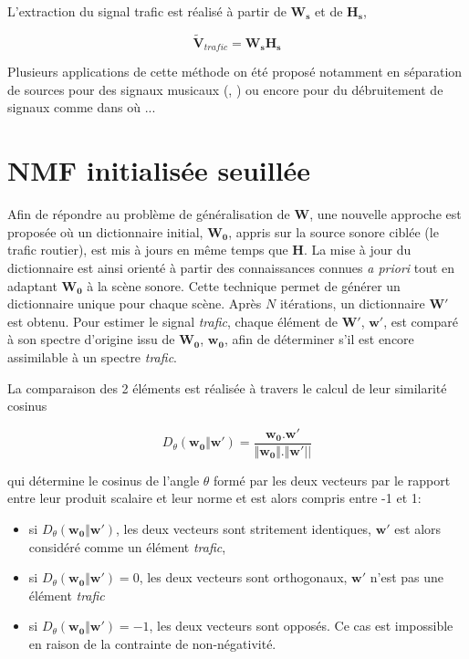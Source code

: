 L'extraction du signal trafic est réalisé à partir de $\mathbf{W_s}$ et de $\mathbf{H_s}$, 

\begin{equation}
\mathbf{\tilde{V}}_{trafic} = \mathbf{W_s H_s}
\end{equation}

Plusieurs applications de cette méthode on été proposé notamment en séparation de sources pour des signaux musicaux (\cite{smaragdis_supervised_2007}, \cite{duan_online_2012}) ou encore pour du débruitement de signaux comme dans \cite{mysore_non-negative_2011} où ... 

\section{NMF initialisée seuillée}\label{sec:NMF_TI}

Afin de répondre au problème de généralisation de $\mathbf{W}$, une nouvelle approche est proposée où un dictionnaire initial, $\mathbf{W_0}$, appris sur la source sonore ciblée (le trafic routier), est mis à jours en même temps que $\mathbf{H}$. La mise à jour du dictionnaire est ainsi orienté à partir des connaissances connues \textit{a priori} tout en adaptant $\mathbf{W_0}$ à la scène sonore. Cette technique permet de générer un dictionnaire unique pour chaque scène. Après $N$ itérations, un dictionnaire $\mathbf{W'}$ est obtenu. Pour estimer le signal \textit{trafic}, chaque élément de $\mathbf{W'}$, $\mathbf{w'}$, est comparé à son spectre d'origine issu de $\mathbf{W_0}$, $\mathbf{w_0}$, afin de déterminer s'il est encore assimilable à un spectre \textit{trafic}.

La comparaison des 2 éléments est réalisée à travers le calcul de leur similarité cosinus

\begin{equation}
 D_{\theta}(\mathbf{w_0}\Vert\mathbf{w'}) = \frac{\mathbf{w_0}.\mathbf{w'}}{\Vert\mathbf{w_0}  \Vert. \Vert\mathbf{w'} \vert \vert}
\end{equation}

 qui détermine le cosinus de l'angle $\theta$ formé par les deux vecteurs par le rapport entre leur produit scalaire et leur norme et est alors compris entre -1 et 1: 

\begin{itemize}
\item si $D_{\theta}(\mathbf{w_0}\Vert\mathbf{w'})$, les deux vecteurs sont stritement identiques, $\mathbf{w'}$ est alors considéré comme un élément \textit{trafic}, 
\item si $D_{\theta}(\mathbf{w_0}\Vert\mathbf{w'}) = 0$, les deux vecteurs sont orthogonaux, $\mathbf{w'}$ n'est pas une élément \textit{trafic}
\item si $D_{\theta}(\mathbf{w_0}\Vert\mathbf{w'}) = -1$, les deux vecteurs sont opposés. Ce cas est impossible en raison de la contrainte de non-négativité.\\
\end{itemize}

